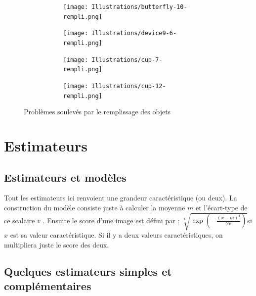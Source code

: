 \documentclass{article}
\theoremstyle{definition}
\begin{document}
      \begin{figure}[!h]
	\centering
	\begin{subfigure}{.47\textwidth}
	  \begin{subfigure}{.52\textwidth}
	    \centering
	    \texttt{[image: Illustrations/butterfly-10-rempli.png]}
	    \label{butterfly-rempli}
	  \end{subfigure}
	  \begin{subfigure}{.45\textwidth}
	    \centering
	    \texttt{[image: Illustrations/device9-6-rempli.png]}
	    \label{spirale-rempli}
	  \end{subfigure}
	\end{subfigure}
	\begin{subfigure}{.44\textwidth}
	  \begin{subfigure}{.46\textwidth}
	    \centering
	    \texttt{[image: Illustrations/cup-7-rempli.png]}
	  \label{1stcup-rempli}
	  \end{subfigure}
	  \begin{subfigure}{.46\textwidth}
	    \centering
	    \texttt{[image: Illustrations/cup-12-rempli.png]}
	  \label{2ndcup-rempli}
	  \end{subfigure}
	\end{subfigure}
	\caption{Problèmes soulevés par le remplissage des objets}
	\label{problèmes-remplissage}
      \end{figure}      
   
  \section{Estimateurs}
  
    \subsection{Estimateurs et modèles}
    
    Tout les estimateurs ici renvoient une grandeur caractéristique (ou deux). La construction du modèle consiste juste à calculer la moyenne $m$ et l'écart-type de ce scalaire $v$ . Ensuite le score d'une image est défini par : $ \sqrt[4]{\exp{\left (-\frac{(x-m)^4}{2v}\right )}}$si $x$ est sa valeur caractéristique. Si il y a deux valeurs caractéristiques, on multipliera juste le score des deux.
  
    \subsection{Quelques estimateurs simples et complémentaires}
\end{document}

